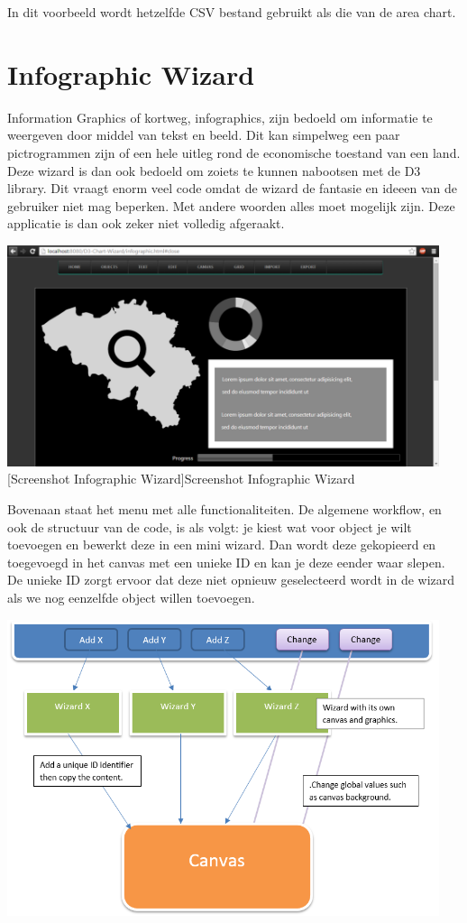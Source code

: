 In dit voorbeeld wordt hetzelfde CSV bestand gebruikt als die van de area chart.
\section{Infographic Wizard}



Information Graphics of kortweg, infographics, zijn bedoeld om informatie te weergeven door middel van tekst en beeld. Dit kan simpelweg een paar pictrogrammen zijn of een hele uitleg rond de economische toestand van een land. Deze wizard is dan ook bedoeld om zoiets te kunnen nabootsen met de D3 library. Dit vraagt enorm veel code omdat de wizard de fantasie en ideeen van de gebruiker niet mag beperken. Met andere woorden alles moet mogelijk zijn. Deze applicatie is dan ook zeker niet volledig afgeraakt.

\begin{center}
  \includegraphics[width=0.95\textwidth]{figures/chap2/infographic.png}
  [Screenshot Infographic Wizard]{Screenshot Infographic Wizard
\label{fig_infographic}}
\end{center}

Bovenaan staat het menu met alle functionaliteiten. De algemene workflow, en ook de structuur van de code, is als volgt: je kiest wat voor object je wilt toevoegen en bewerkt deze in een mini wizard. Dan wordt deze gekopieerd en toegevoegd in het canvas met een unieke ID en kan je deze eender waar slepen. De unieke ID zorgt ervoor dat deze niet opnieuw geselecteerd wordt in de wizard als we nog eenzelfde object willen toevoegen. 

\begin{center}
  \includegraphics[width=0.95\textwidth]{figures/chap2/infographics-workflow.png}
\end{center}


